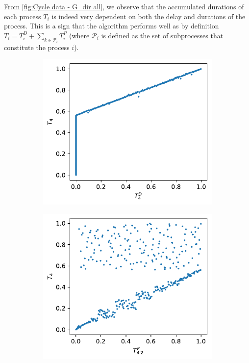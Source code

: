 \documentclass[../Thesis.tex]{subfiles}
\begin{document}
From \autoref{fig:Cycle data - G_dir all}, we observe that the accumulated durations of each process $T_i$ is indeed very dependent on both the delay and durations of the process. This is a sign that the algorithm performs well as by definition $T_i = T^D_i + \sum_{k\in \mathcal{P}_i} T^P_i$ (where $\mathcal{P}_i$ is defined as the set of subprocesses that constitute the process $i$).
\begin{figure}[H]
    \centering
    \begin{subfigure}[t]{0.49\linewidth}
        \includegraphics[width = \linewidth]{figures/Cycle data/G_dir complete - symmetric - TD4 vs T4.pdf}
        \caption{}
    \end{subfigure}
    \hfill
    \begin{subfigure}[t]{0.49\linewidth}
        \includegraphics[width = \linewidth]{figures/Cycle data/G_dir complete - symmetric - TP4 vs T4.pdf}

\end{subfigure}
\end{figure}
\end{document}
